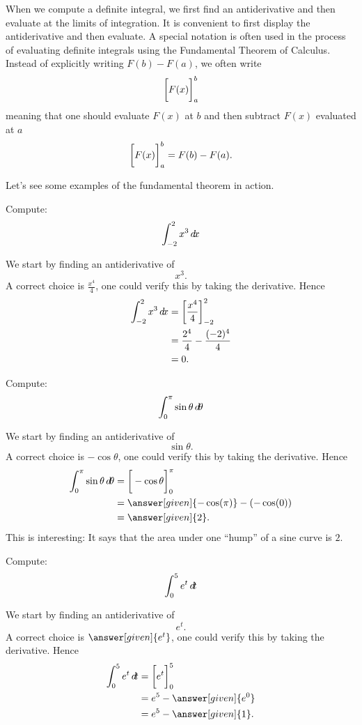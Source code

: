 \documentclass{ximera}
\begin{document}
When we compute a definite integral, we first find an antiderivative
and then evaluate at the limits of integration. It is convenient to
first display the antiderivative and then evaluate.  A special
notation is often used in the process of evaluating definite integrals
using the Fundamental Theorem of Calculus. Instead of explicitly
writing $F(b)-F(a)$, we often write
\[
\bigg[ F(x) \bigg]_a^b
\]
meaning that one should evaluate $F(x)$ at $b$ and then subtract
$F(x)$ evaluated at $a$
\[
\bigg[ F(x) \bigg]_a^b = F(b)-F(a).
\]

Let's see some examples of the fundamental theorem in action.

\begin{example}
  Compute:
  \[
  \int_{-2}^2 x^3\mathop{}\!d\! x
  \]
  \begin{explanation}
    We start by finding an antiderivative of
    \[
    x^3.
    \]
    A correct choice is $\frac{x^{4}}{4}$, one could verify
    this by taking the derivative. Hence
    \begin{align*}
      \int_{-2}^2 x^3 \mathop{}\!d\! x &=\bigg[ \frac{x^4}{4} \bigg]_{-2}^2\\
      &= \frac{2^4}{4} - \frac{(-2)^4}{4}\\
      &= 0.
    \end{align*}
  \end{explanation}
\end{example}


\begin{example}
  Compute:
  \[
  \int_0^\pi \sin \theta \mathop{}\!d\! \theta
  \]
  \begin{explanation}
    We start by finding an antiderivative of
    \[
    \sin \theta.
    \]
    A correct choice is $-\cos\theta$, one could verify
    this by taking the derivative. Hence
    \begin{align*}
      \int_0^\pi \sin\theta \d \theta &= \eval{-\cos\theta}_0^\pi\\
      &=\answer[given]{-\cos(\pi)} - (-\cos(0))\\
      &=\answer[given]{2}.
    \end{align*}
    This is interesting: It says that the area under one ``hump'' of a
    sine curve is $2$.
  \end{explanation}
\end{example}

\begin{example}
  Compute:
  \[
  \int_0^5 e^t\mathop{}\!d\! t
  \]
  \begin{explanation}
    We start by finding an antiderivative of
    \[
    e^t.
    \]
    A correct choice is $\answer[given]{e^t}$, one could verify this by taking the
    derivative. Hence
    \begin{align*}
      \int_0^5 e^t \d t &= \eval{e^t}_0^5 \\
      &= e^5-\answer[given]{e^0}\\
      &= e^5-\answer[given]{1}.
    \end{align*}
  \end{explanation}
\end{example}
\end{document}
